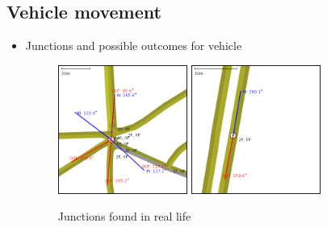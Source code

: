 \subsection{Vehicle movement}
\begin{itemize}
    \item Junctions and possible outcomes for vehicle
        \begin{figure}
            \caption{Junctions found in real life}
            \label{fig:junctionTypes}
            \centering
            \includegraphics[width=0.4\textwidth]{figs/junction/junction_5_roads.png}
            \hspace{0.2em}
            \includegraphics[width=0.4\textwidth]{figs/junction/junction_two_roads.png}
        \end{figure}


\end{itemize}
